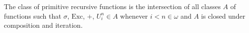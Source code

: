 The class of primitive recursive functions is the intersection of all classes $A$ of functions such that $\sigma$, $\mathrm{Exc}$, $+$, $U_i^n \in A$ whenever $i < n \in \omega$ and $A$ is closed under composition and iteration.
